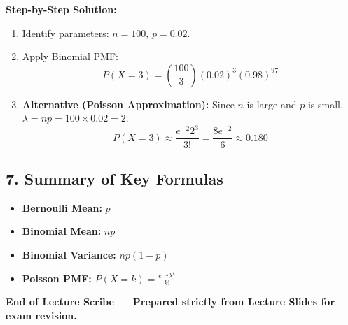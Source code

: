 \documentclass[11pt]{article}
\begin{document}
\textbf{Step-by-Step Solution:}
\begin{enumerate}
    \item Identify parameters: $n=100$, $p=0.02$.
    \item Apply Binomial PMF:
    \begin{equation}
        P(X=3) = \binom{100}{3} (0.02)^3 (0.98)^{97}
    \end{equation}
    \item \textbf{Alternative (Poisson Approximation):} Since $n$ is large and $p$ is small, $\lambda = np = 100 \times 0.02 = 2$.
    \begin{equation}
        P(X=3) \approx \frac{e^{-2} 2^3}{3!} = \frac{8 e^{-2}}{6} \approx 0.180
    \end{equation}
\end{enumerate}

\subsection*{7. Summary of Key Formulas}
\begin{itemize}
    \item \textbf{Bernoulli Mean:} $p$
    \item \textbf{Binomial Mean:} $np$
    \item \textbf{Binomial Variance:} $np(1-p)$
    \item \textbf{Poisson PMF:} $P(X=k) = \frac{e^{-\lambda} \lambda^k}{k!}$
\end{itemize}

\vfill
\noindent \textbf{End of Lecture Scribe — Prepared strictly from Lecture Slides for exam revision.}
\end{document}
